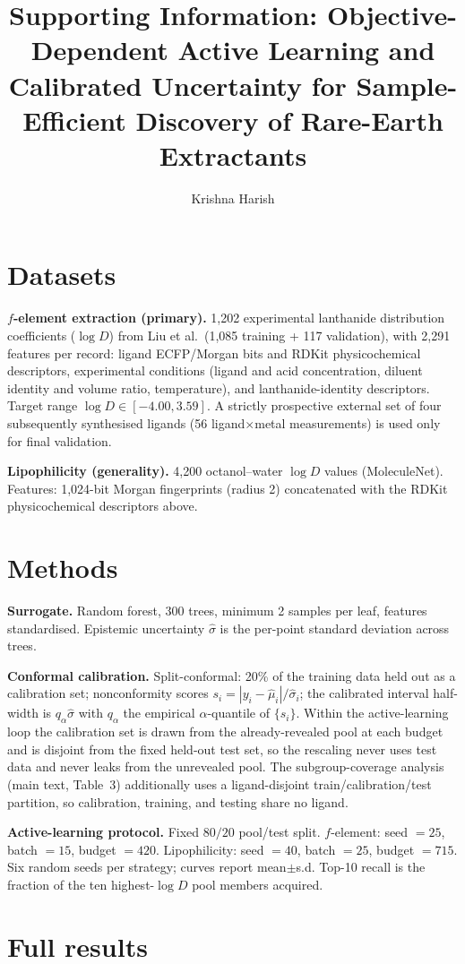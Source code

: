 \documentclass[journal=acsodf,manuscript=suppinfo]{achemso}
\author{Krishna Harish}
\affiliation{Lawrence E. Elkins High School, Missouri City, Texas, USA}
\title{Supporting Information: Objective-Dependent Active Learning and Calibrated
Uncertainty for Sample-Efficient Discovery of Rare-Earth Extractants}
\begin{document}
\section{Datasets}
\textbf{$f$-element extraction (primary).} 1{,}202 experimental lanthanide
distribution coefficients ($\log D$) from Liu et al.\ (1{,}085 training + 117
validation), with 2{,}291 features per record: ligand ECFP/Morgan bits and RDKit
physicochemical descriptors, experimental conditions (ligand and acid
concentration, diluent identity and volume ratio, temperature), and
lanthanide-identity descriptors. Target range $\log D\in[-4.00,3.59]$. A
strictly prospective external set of four subsequently synthesised ligands
(56 ligand$\times$metal measurements) is used only for final validation.

\textbf{Lipophilicity (generality).} 4{,}200 octanol--water $\log D$ values
(MoleculeNet). Features: 1{,}024-bit Morgan fingerprints (radius 2) concatenated
with the RDKit physicochemical descriptors above.

\section{Methods}
\textbf{Surrogate.} Random forest, 300 trees, minimum 2 samples per leaf, features
standardised. Epistemic uncertainty $\hat\sigma$ is the per-point standard deviation
across trees.

\textbf{Conformal calibration.} Split-conformal: 20\% of the training data held out
as a calibration set; nonconformity scores $s_i=|y_i-\hat\mu_i|/\hat\sigma_i$; the
calibrated interval half-width is $q_\alpha\hat\sigma$ with $q_\alpha$ the empirical
$\alpha$-quantile of $\{s_i\}$. Within the active-learning loop the calibration set is
drawn from the already-revealed pool at each budget and is disjoint from the fixed
held-out test set, so the rescaling never uses test data and never leaks from the
unrevealed pool. The subgroup-coverage analysis (main text, Table~3) additionally uses
a ligand-disjoint train/calibration/test partition, so calibration, training, and
testing share no ligand.

\textbf{Active-learning protocol.} Fixed $80/20$ pool/test split. $f$-element:
seed $=25$, batch $=15$, budget $=420$. Lipophilicity: seed $=40$, batch $=25$,
budget $=715$. Six random seeds per strategy; curves report mean$\pm$s.d. Top-10
recall is the fraction of the ten highest-$\log D$ pool members acquired.

\section{Full results}
\end{document}
